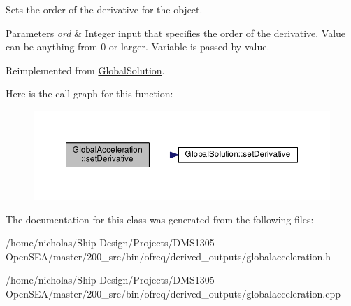 Sets the order of the derivative for the object. 


\begin{DoxyParams}{Parameters}
{\em ord} & Integer input that specifies the order of the derivative. Value can be anything from 0 or larger. Variable is passed by value. \\
\hline
\end{DoxyParams}


Reimplemented from \hyperlink{class_global_solution_a537163391f1f55d073720b20f69acfa5}{Global\-Solution}.



Here is the call graph for this function\-:\nopagebreak
\begin{figure}[H]
\begin{center}
\leavevmode
\includegraphics[width=350pt]{class_global_acceleration_a14a041ea42d4c1bc10211c9a44aa3431_cgraph}
\end{center}
\end{figure}




The documentation for this class was generated from the following files\-:\begin{DoxyCompactItemize}
\item 
/home/nicholas/\-Ship Design/\-Projects/\-D\-M\-S1305 Open\-S\-E\-A/master/200\-\_\-src/bin/ofreq/derived\-\_\-outputs/globalacceleration.\-h\item 
/home/nicholas/\-Ship Design/\-Projects/\-D\-M\-S1305 Open\-S\-E\-A/master/200\-\_\-src/bin/ofreq/derived\-\_\-outputs/globalacceleration.\-cpp\end{DoxyCompactItemize}
